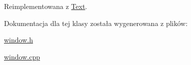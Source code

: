 Reimplementowana z \hyperlink{classText_ab334ff82f41302f83bebf3eaf2516a84}{Text}.



Dokumentacja dla tej klasy została wygenerowana z plików\+:\begin{DoxyCompactItemize}
\item 
\hyperlink{window_8h}{window.\+h}\item 
\hyperlink{window_8cpp}{window.\+cpp}\end{DoxyCompactItemize}
